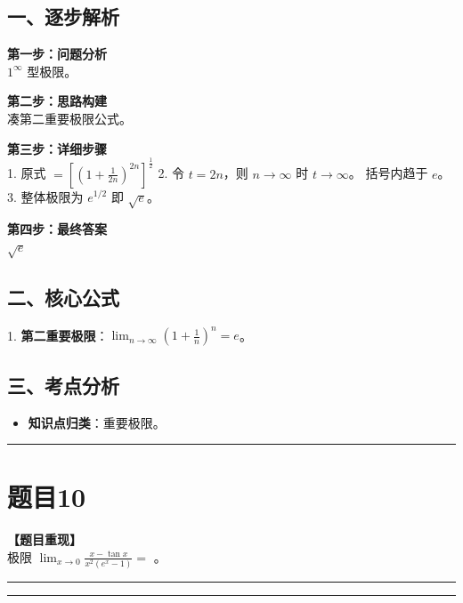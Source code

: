 \documentclass[12pt, a4paper]{ctexart}
\newcommand{\TopSeparator}{
    \par\noindent\rule{\textwidth}{1.5pt}\vspace{0.5em} %
}
\newcommand{\AnalysisSeparator}{
    \par\noindent\rule{\textwidth}{0.5pt}\vspace{0.2em}\hrule\vspace{0.5em} %
}
\newenvironment{RedAnalysis}{
    \par
    \color{red} %
}{
    \par
    \color{black} %
}
\begin{document}
\begin{RedAnalysis}

\subsection*{一、逐步解析}

\textbf{第一步：问题分析} \\
$1^\infty$ 型极限。

\textbf{第二步：思路构建} \\
凑第二重要极限公式。

\textbf{第三步：详细步骤} \\
1. 原式 $= \left[ \left(1+\frac{1}{2n}\right)^{2n} \right]^{\frac{1}{2}}$
2. 令 $t = 2n$，则 $n \to \infty$ 时 $t \to \infty$。
   括号内趋于 $e$。
3. 整体极限为 $e^{1/2}$ 即 $\sqrt{e}$。

\textbf{第四步：最终答案} \\
$\sqrt{e}$

\subsection*{二、核心公式}
1. \textbf{第二重要极限}：$\lim_{n\to\infty} (1+\frac{1}{n})^n = e$。

\subsection*{三、考点分析}
\begin{itemize}
    \item \textbf{知识点归类}：重要极限。
\end{itemize}

\end{RedAnalysis}

\vspace{2em}

\TopSeparator
\section*{题目10}

\textbf{【题目重现】} \\
极限 $ \lim_{x \to 0} \frac{x - \tan x}{x^{2}(e^{x} - 1)} = $ \underline{\hspace{2cm}}。

\AnalysisSeparator
\end{document}

